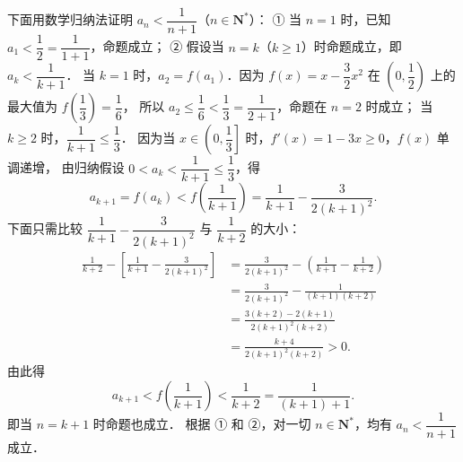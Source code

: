 \begin{answer}
下面用数学归纳法证明 $a_n < \dfrac{1}{n+1}$（$n \in \mathbf{N}^*$）：
① 当 $n = 1$ 时，已知 $a_1 < \dfrac{1}{2} = \dfrac{1}{1 + 1}$，命题成立；
② 假设当 $n = k$（$k \geqslant 1$）时命题成立，即 $a_k < \dfrac{1}{k + 1}$．
当 $k = 1$ 时，$a_2 = f(a_1)$．因为 $f(x) = x - \dfrac{3}{2}x^2$ 在 $\left(0, \dfrac{1}{2}\right)$ 上的最大值为 $f\left(\dfrac{1}{3}\right) = \dfrac{1}{6}$，
所以 $a_2 \leqslant \dfrac{1}{6} < \dfrac{1}{3} = \dfrac{1}{2 + 1}$，命题在 $n = 2$ 时成立；
当 $k \geqslant 2$ 时，$\dfrac{1}{k + 1} \leqslant \dfrac{1}{3}$．
因为当 $x \in \left(0, \dfrac{1}{3}\right]$ 时，$f'(x) = 1 - 3x \geqslant 0$，$f(x)$ 单调递增，
由归纳假设 $0 < a_k < \dfrac{1}{k + 1} \leqslant \dfrac{1}{3}$，得
\nopagebreak[4]
\[
a_{k+1} = f(a_k) < f\left(\frac{1}{k + 1}\right) = \frac{1}{k + 1} - \frac{3}{2(k + 1)^2}.
\]
下面只需比较 $\dfrac{1}{k + 1} - \dfrac{3}{2(k + 1)^2}$ 与 $\dfrac{1}{k + 2}$ 的大小：
\nopagebreak[4]
\[
\begin{aligned}
\frac{1}{k + 2} - \left[\frac{1}{k + 1} - \frac{3}{2(k + 1)^2}\right] &= \frac{3}{2(k + 1)^2} - \left(\frac{1}{k + 1} - \frac{1}{k + 2}\right) \\
&= \frac{3}{2(k + 1)^2} - \frac{1}{(k + 1)(k + 2)} \\
&= \frac{3(k + 2) - 2(k + 1)}{2(k + 1)^2(k + 2)} \\
&= \frac{k + 4}{2(k + 1)^2(k + 2)} > 0.
\end{aligned}
\]
由此得
\nopagebreak[4]
\[
a_{k+1} < f\left(\frac{1}{k + 1}\right) < \frac{1}{k + 2} = \frac{1}{(k + 1) + 1}.
\]
即当 $n = k + 1$ 时命题也成立．
根据 ① 和 ②，对一切 $n \in \mathbf{N}^*$，均有 $a_n < \dfrac{1}{n+1}$ 成立．


\end{answer}
